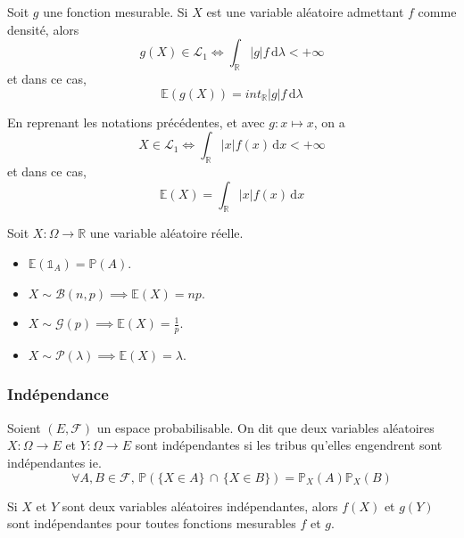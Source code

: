   \begin{corollary}
    Soit $g$ une fonction mesurable. Si $X$ est une variable aléatoire admettant $f$ comme densité, alors
    \[ g(X) \in \mathcal{L}_1 \iff \int_{\mathbb{R}} \vert g \vert f \, \mathrm{d}\lambda < +\infty \]
    et dans ce cas,
    \[ \mathbb{E}(g(X)) = int_{\mathbb{R}} \vert g \vert f \, \mathrm{d}\lambda \]
  \end{corollary}

  \begin{remark}
    En reprenant les notations précédentes, et avec $g : x \mapsto x$, on a
    \[ X \in \mathcal{L}_1 \iff \int_{\mathbb{R}} \vert x \vert f(x) \, \mathrm{d}x < +\infty \]
    et dans ce cas,
    \[ \mathbb{E}(X) = \int_{\mathbb{R}} \vert x \vert f(x) \, \mathrm{d}x \]
  \end{remark}


  \begin{example}
    Soit $X : \Omega \rightarrow \mathbb{R}$ une variable aléatoire réelle.
    \begin{itemize}
      \item $\mathbb{E}(\mathbb{1}_A) = \mathbb{P}(A)$.
      \item $X \sim \mathcal{B}(n, p) \implies \mathbb{E}(X) = np$.
      \item $X \sim \mathcal{G}(p) \implies \mathbb{E}(X) = \frac{1}{p}$.
      \item $X \sim \mathcal{P}(\lambda) \implies \mathbb{E}(X) = \lambda$.
    \end{itemize}
  \end{example}

  \subsubsection{Indépendance}


  \begin{definition}
    Soient $(E, \mathcal{F})$ un espace probabilisable. On dit que deux variables aléatoires $X : \Omega \rightarrow E$ et $Y : \Omega \rightarrow E$ sont indépendantes si les tribus qu'elles engendrent sont indépendantes ie.
    \[ \forall A, B \in \mathcal{F}, \, \mathbb{P}(\{ X \in A \} \, \cap \, \{ X \in B \}) = \mathbb{P}_X(A) \mathbb{P}_X(B) \]
  \end{definition}

  \begin{proposition}
    Si $X$ et $Y$ sont deux variables aléatoires indépendantes, alors $f(X)$ et $g(Y)$ sont indépendantes pour toutes fonctions mesurables $f$ et $g$.
  \end{proposition}

